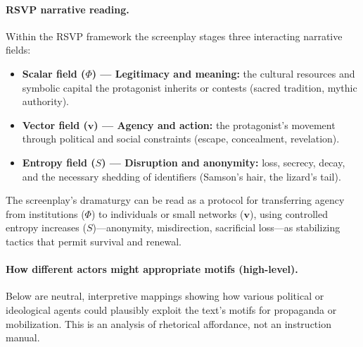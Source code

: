 \documentclass[12pt]{article}
\begin{document}
\paragraph{RSVP narrative reading.}
Within the RSVP framework the screenplay stages three interacting narrative fields:
\begin{itemize}
  \item \textbf{Scalar field (\(\Phi\)) — Legitimacy and meaning:} the cultural resources and symbolic capital the protagonist inherits or contests (sacred tradition, mythic authority).
  \item \textbf{Vector field (\(\mathbf{v}\)) — Agency and action:} the protagonist’s movement through political and social constraints (escape, concealment, revelation).
  \item \textbf{Entropy field (\(S\)) — Disruption and anonymity:} loss, secrecy, decay, and the necessary shedding of identifiers (Samson’s hair, the lizard’s tail).
\end{itemize}
The screenplay’s dramaturgy can be read as a protocol for transferring agency from institutions (\(\Phi\)) to individuals or small networks (\(\mathbf{v}\)), using controlled entropy increases (\(S\))—anonymity, misdirection, sacrificial loss—as stabilizing tactics that permit survival and renewal.

\paragraph{How different actors might appropriate motifs (high-level).}
Below are neutral, interpretive mappings showing how various political or ideological agents could plausibly exploit the text’s motifs for propaganda or mobilization. This is an analysis of rhetorical affordance, not an instruction manual.
\end{document}
